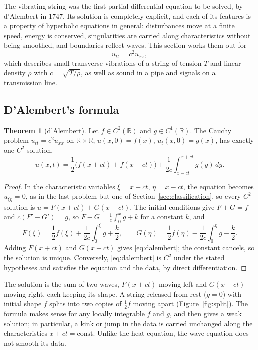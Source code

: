 \documentclass[11pt,a4paper]{article}
\numberwithin{equation}{section}
\theoremstyle{definition}
\newtheorem{thm}{Theorem}[subsection]
\begin{document}
The vibrating string was the first partial differential equation to be solved, by d'Alembert in 1747. Its solution is completely explicit, and each of its features is a property of hyperbolic equations in general:
disturbances move at a finite speed, energy is conserved, singularities are carried along characteristics without being smoothed, and boundaries reflect waves. This section works them out for
\begin{equation}
\label{eq:wave1d}
u_{tt} = c^2u_{xx} ,
\end{equation}
which describes small transverse vibrations of a string of tension $T$ and linear density $\rho$ with $c = \sqrt{T/\rho}$, as well as sound in a pipe and signals on a transmission line.

\subsection{D'Alembert's formula}
\label{ssec:dalembert}

\begin{thm}[d'Alembert]
\label{thm:dalembert}
Let $f \in C^2(\mathbb R)$ and $g \in C^1(\mathbb R)$. The Cauchy problem $u_{tt} = c^2u_{xx}$ on $\mathbb R \times \mathbb R$, $u(x, 0) = f(x)$, $u_t(x, 0) = g(x)$, has exactly one $C^2$ solution,
\begin{equation}
\label{eq:dalembert}
u(x, t) = \frac12\bigl(f(x + ct) + f(x - ct)\bigr) + \frac{1}{2c}\int_{x - ct}^{x + ct}g(y)\,dy .
\end{equation}
\end{thm}

\begin{proof}
In the characteristic variables $\xi = x + ct$, $\eta = x - ct$, the equation becomes $u_{\xi\eta} = 0$, as in the last problem but one of Section~\ref{sec:classification}, so every $C^2$ solution is $u = F(x + ct) + G(x - ct)$. The initial conditions give $F + G = f$ and $c(F' - G') = g$, so
$F - G = \frac1c\int_0^xg + k$ for a constant $k$, and
\[
F(\xi) = \frac12f(\xi) + \frac1{2c}\int_0^\xi g + \frac k2, \qquad G(\eta) = \frac12f(\eta) - \frac1{2c}\int_0^\eta g - \frac k2 .
\]
Adding $F(x + ct)$ and $G(x - ct)$ gives \eqref{eq:dalembert}; the constant cancels, so the solution is unique. Conversely, \eqref{eq:dalembert} is $C^2$ under the stated hypotheses and satisfies the equation and the data, by direct differentiation.
\end{proof}

The solution is the sum of two waves, $F(x + ct)$ moving left and $G(x - ct)$ moving right, each keeping its shape. A string released from rest ($g = 0$) with initial shape $f$ splits into two copies of $\frac12f$ moving apart (Figure~\ref{fig:split}). The formula
makes sense for any locally integrable $f$ and $g$, and then gives a weak solution; in particular, a kink or jump in the data is carried unchanged along the characteristics $x \pm ct = \text{const}$. Unlike the heat equation, the wave equation does not smooth its data.
\end{document}
